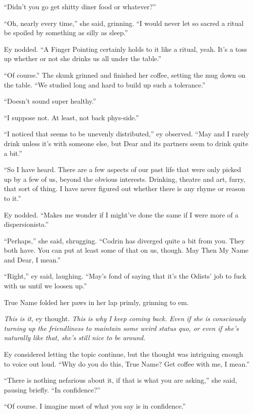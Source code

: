 ``Didn't you go get shitty diner food or whatever?''

``Oh, nearly every time,'' she said, grinning. ``I would never let so sacred a ritual be spoiled by something as silly as sleep.''

Ey nodded. ``A Finger Pointing certainly holds to it like a ritual, yeah. It's a toss up whether or not she drinks us all under the table.''

``Of course.'' The skunk grinned and finished her coffee, setting the mug down on the table. ``We studied long and hard to build up such a tolerance.''

``Doesn't sound super healthy.''

``I suppose not. At least, not back phys-side.''

``I noticed that seems to be unevenly distributed,'' ey observed. ``May and I rarely drink unless it's with someone else, but Dear and its partners seem to drink quite a bit.''

``So I have heard. There are a few aspects of our past life that were only picked up by a few of us, beyond the obvious interests. Drinking, theatre and art, furry, that sort of thing. I have never figured out whether there is any rhyme or reason to it.''

Ey nodded. ``Makes me wonder if I might've done the same if I were more of a dispersionista.''

``Perhaps,'' she said, shrugging. ``Codrin has diverged quite a bit from you. They both have. You can put at least some of that on us, though. May Then My Name and Dear, I mean.''

``Right,'' ey said, laughing. ``May's fond of saying that it's the Odists' job to fuck with us until we loosen up.''

True Name folded her paws in her lap primly, grinning to em.

\emph{This is it,} ey thought. \emph{This is why I keep coming back. Even if she is consciously turning up the friendliness to maintain some weird status quo, or even if she's naturally like that, she's still nice to be around.}

Ey considered letting the topic continue, but the thought was intriguing enough to voice out loud. ``Why do you do this, True Name? Get coffee with me, I mean.''

``There is nothing nefarious about it, if that is what you are asking,'' she said, pausing briefly. ``In confidence?''

``Of course. I imagine most of what you say is in confidence.''

